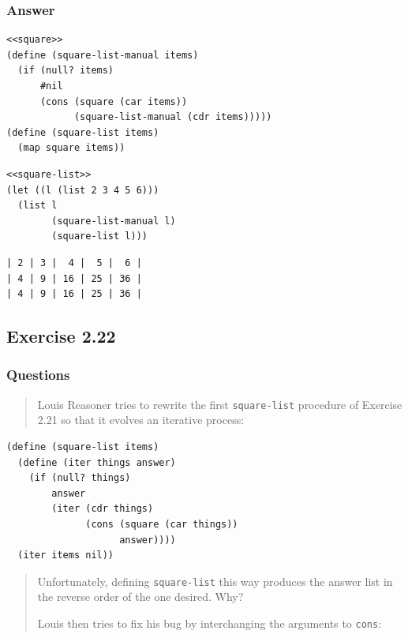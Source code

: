 \documentclass[final,fleqn,titlepage,twoside]{article}
\begin{document}
\subsubsection{Answer}
\label{sec:org956fecf}
\begin{verbatim}
<<square>>
(define (square-list-manual items)
  (if (null? items)
      #nil
      (cons (square (car items))
            (square-list-manual (cdr items)))))
(define (square-list items)
  (map square items))
\end{verbatim}
\begin{verbatim}
<<square-list>>
(let ((l (list 2 3 4 5 6)))
  (list l
        (square-list-manual l)
        (square-list l)))
\end{verbatim}

\begin{verbatim}
| 2 | 3 |  4 |  5 |  6 |
| 4 | 9 | 16 | 25 | 36 |
| 4 | 9 | 16 | 25 | 36 |
\end{verbatim}

\subsection{Exercise 2.22}
\label{sec:orgb35af65}
\subsubsection{Questions}
\label{sec:orga7b9fe7}
\begin{quote}
Louis Reasoner tries to rewrite the first \texttt{square-list} procedure of
Exercise 2.21 so that it evolves an iterative process:
\end{quote}

\begin{verbatim}
(define (square-list items)
  (define (iter things answer)
    (if (null? things)
        answer
        (iter (cdr things)
              (cons (square (car things))
                    answer))))
  (iter items nil))
\end{verbatim}

\begin{quote}
Unfortunately, defining \texttt{square-list} this way produces the answer
list in the reverse order of the one desired. Why?

Louis then tries to fix his bug by interchanging the arguments to
\texttt{cons}:
\end{quote}
\end{document}
